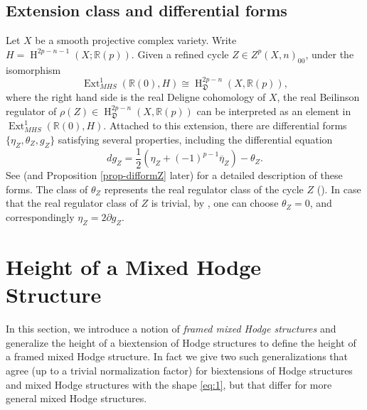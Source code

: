 \documentclass[11pt,a4paper]{amsart}
\newcommand{\R}{\mathds{R}}
\newcommand{\fD}{\mathfrak{D}}
\DeclareMathOperator{\Ext}{Ext}
\DeclareMathOperator{\rH}{H}
\numberwithin{equation}{section}
\theoremstyle{plain}
\theoremstyle{definition}
\begin{document}
\subsection{Extension class and differential forms}
Let $X$ be a smooth projective complex variety.  
Write $H=\rH^{2p-n-1}(X; \R(p))$.
Given a refined cycle $Z\in Z^{p}(X,n)_{00}$, under the isomorphism 
\begin{displaymath}
\Ext^{1}_{MHS}(\R(0), H)\cong \rH^{2p-n}_{\fD}(X, \R(p)),
\end{displaymath}
where the right hand side is the real Deligne cohomology of $X$,
the real Beilinson regulator
of $\rho(Z)\in \rH^{2p-n}_{\fD}(X, \R(p))$ can be interpreted as an
element in $\Ext^{1}_{MHS}(\R(0), H)$. 
Attached to this extension, there are
differential forms $\{\eta_{Z}, \theta_{Z}, g_{Z}\}$ satisfying
several properties, including the differential equation 
\begin{displaymath}
dg_{Z}=\frac{1}{2}(\eta_{Z}+(-1)^{p-1}\overline{\eta}_{Z})-\theta_{Z}.
\end{displaymath}
See \cite[\S 3]{BGGP:Height} (and Proposition \ref{prop-difformZ}
later) for a detailed description of these forms.
The class of $\theta_{Z}$ represents the real regulator class
of the cycle $Z$ (\cite[Proposition 3.6, Proposition
3.8]{BGGP:Height}).
In case that the
real regulator class of $Z$ is trivial, by \cite[Corollary
3.9]{BGGP:Height}, one can choose $\theta_{Z}=0$, and correspondingly
$\eta_{Z}=2\partial g_{Z}$.  

\section{Height of a Mixed Hodge Structure}\label{sec:deligne-splitting-height}
In this section, we introduce a notion of \emph{framed mixed
Hodge structures} and generalize the height of a biextension of
Hodge structures to define the height of a framed mixed Hodge
structure. In fact we give two such generalizations that agree (up to
a trivial normalization factor) for biextensions of Hodge structures
and mixed Hodge structures with the shape \eqref{eq:1}, but that differ 
for more general mixed Hodge structures. 
\end{document}
